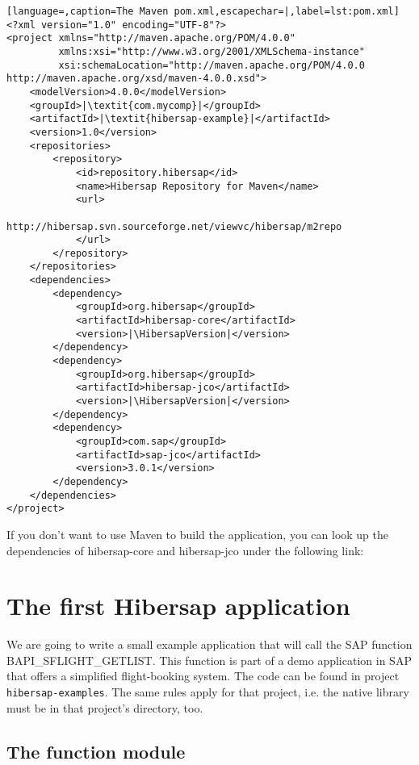 \begin{lstlisting}[language=,caption=The Maven pom.xml,escapechar=|,label=lst:pom.xml]
<?xml version="1.0" encoding="UTF-8"?>
<project xmlns="http://maven.apache.org/POM/4.0.0"
         xmlns:xsi="http://www.w3.org/2001/XMLSchema-instance"
         xsi:schemaLocation="http://maven.apache.org/POM/4.0.0 http://maven.apache.org/xsd/maven-4.0.0.xsd">
    <modelVersion>4.0.0</modelVersion>
    <groupId>|\textit{com.mycomp}|</groupId>
    <artifactId>|\textit{hibersap-example}|</artifactId>
    <version>1.0</version>
    <repositories>
        <repository>
            <id>repository.hibersap</id>
            <name>Hibersap Repository for Maven</name>
            <url>
              http://hibersap.svn.sourceforge.net/viewvc/hibersap/m2repo
            </url>
        </repository>
    </repositories>                 
    <dependencies>
        <dependency>
            <groupId>org.hibersap</groupId>
            <artifactId>hibersap-core</artifactId>
            <version>|\HibersapVersion|</version>
        </dependency>
        <dependency>
            <groupId>org.hibersap</groupId>
            <artifactId>hibersap-jco</artifactId>
            <version>|\HibersapVersion|</version>
        </dependency>
        <dependency>
            <groupId>com.sap</groupId>
            <artifactId>sap-jco</artifactId>
            <version>3.0.1</version>
        </dependency>
    </dependencies>
</project>
\end{lstlisting}

If you don't want to use Maven to build the application, you can look up the dependencies of hibersap-core and hibersap-jco under the following link: \urlHibersapDependencies

\section{The first Hibersap application}

We are going to write a small example application that will call the SAP function \linebreak BAPI\_SFLIGHT\_GETLIST.
This function is part of a demo application in SAP that offers a simplified flight-booking system.
The code can be found in project {\tt hibersap-examples}. The same rules apply for that project, i.e. the native
library must be in that project's directory, too.


\subsection{The function module}

